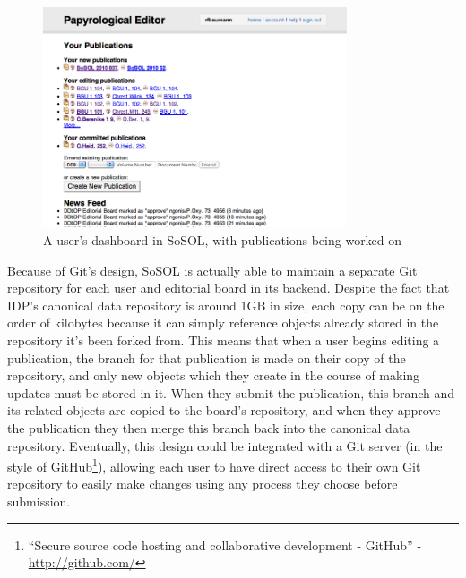 \documentclass[]{article}
\begin{document}
\begin{figure}[]
  \centering
  \includegraphics[width=0.8\textwidth]{images/dashboard.png}
  \caption{A user's dashboard in SoSOL, with publications being worked on\label{dashboard}}
\end{figure}

Because of Git's design, SoSOL is actually able to maintain a separate Git repository for each user and editorial board in its backend. Despite the fact that IDP's canonical data repository is around 1GB in size, each copy can be on the order of kilobytes because it can simply reference objects already stored in the repository it's been forked from. This means that when a user begins editing a publication, the branch for that publication is made on their copy of the repository, and only new objects which they create in the course of making updates must be stored in it. When they submit the publication, this branch and its related objects are copied to the board's repository, and when they approve the publication they then merge this branch back into the canonical data repository. Eventually, this design could be integrated with a Git server (in the style of GitHub\footnote{“Secure source code hosting and collaborative development - GitHub” - \url{http://github.com/}}), allowing each user to have direct access to their own Git repository to easily make changes using any process they choose before submission.
\end{document}
